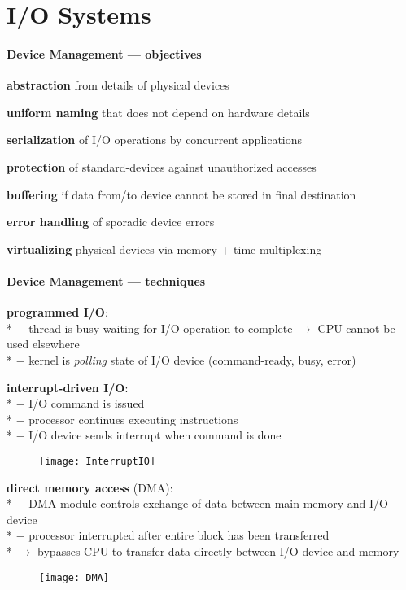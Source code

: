 \section{I/O Systems}

\paragraph{Device Management --- objectives}
\begin{items}
  \item \textbf{abstraction} from details of physical devices
  \item \textbf{uniform naming} that does not depend on hardware details
  \item \textbf{serialization} of I/O operations by concurrent applications
  \item \textbf{protection} of standard-devices against unauthorized accesses
  \item \textbf{buffering} if data from/to device cannot be stored in final destination
  \item \textbf{error handling} of sporadic device errors
  \item \textbf{virtualizing} physical devices via memory + time multiplexing
\end{items}

\paragraph{Device Management --- techniques}
\begin{items}
  \item \textbf{programmed I/O}: \\*
    $ - $ thread is busy-waiting for I/O operation to complete $ \to $ CPU cannot be used elsewhere \\*
    $ - $ kernel is \emph{polling} state of I/O device (command-ready, busy, error)
  \item \textbf{interrupt-driven I/O}: \\*
    $ - $ I/O command is issued \\*
    $ - $ processor continues executing instructions \\*
    $ - $ I/O device sends interrupt when command is done
  \begin{figure}[H]\centering\label{InterruptIO}\texttt{[image: InterruptIO]}\end{figure}
  \item \textbf{direct memory access} (DMA): \\*
    $ - $ DMA module controls exchange of data between main memory and I/O device \\*
    $ - $ processor interrupted after entire block has been transferred \\*
    $ \to $ bypasses CPU to transfer data directly between I/O device and memory
  \begin{figure}[H]\centering\label{DMA}\texttt{[image: DMA]}\end{figure}
\end{items}

